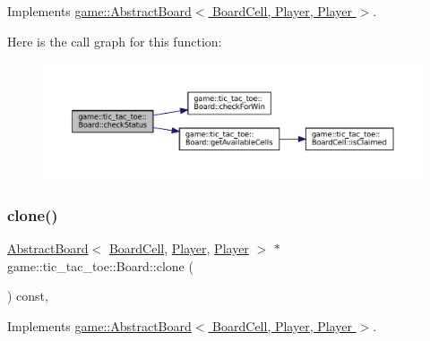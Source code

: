 Implements \hyperlink{classgame_1_1_abstract_board_a689982e6640633d78008157906c6d63a}{game\+::\+Abstract\+Board$<$ Board\+Cell, Player, Player $>$}.

Here is the call graph for this function\+:
\nopagebreak
\begin{figure}[H]
\begin{center}
\leavevmode
\includegraphics[width=350pt]{classgame_1_1tic__tac__toe_1_1_board_ae91180193e944c9c58d7d1d0f439918e_cgraph}
\end{center}
\end{figure}
\mbox{\label{classgame_1_1tic__tac__toe_1_1_board_a9d7a2c225f06a3410b11b688d9d6bcf8}} 
\subsubsection{\texorpdfstring{clone()}{clone()}}
{\footnotesize\ttfamily \hyperlink{classgame_1_1_abstract_board}{Abstract\+Board}$<$ \hyperlink{classgame_1_1tic__tac__toe_1_1_board_cell}{Board\+Cell}, \hyperlink{classgame_1_1tic__tac__toe_1_1_player}{Player}, \hyperlink{classgame_1_1tic__tac__toe_1_1_player}{Player} $>$ $\ast$ game\+::tic\+\_\+tac\+\_\+toe\+::\+Board\+::clone (\begin{DoxyParamCaption}{ }\end{DoxyParamCaption}) const\hspace{0.3cm}{\ttfamily [override]}, {\ttfamily [virtual]}}



Implements \hyperlink{classgame_1_1_abstract_board_abd467b64fd2c0dfbc0ce87200afb3e9e}{game\+::\+Abstract\+Board$<$ Board\+Cell, Player, Player $>$}.

